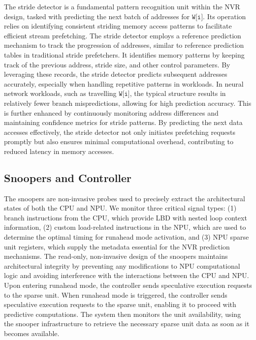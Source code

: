 The stride detector is a fundamental pattern recognition unit within the NVR design, tasked with predicting the next batch of addresses for $\texttt{W[i]}$. Its operation relies on identifying consistent striding memory access patterns to facilitate efficient stream prefetching.
The stride detector employs a reference prediction mechanism to track the progression of addresses, similar to reference prediction tables in traditional stride prefetchers. It identifies memory patterns by keeping track of the previous address, stride size, and other control parameters. By leveraging these records, the stride detector predicts subsequent addresses accurately, especially when handling repetitive patterns in workloads. 
In neural network workloads, such as travelling $\texttt{W[i]}$, the typical structure results in relatively fewer branch mispredictions, allowing for high prediction accuracy. 
This is further enhanced by continuously monitoring address differences and maintaining confidence metrics for stride patterns. By predicting the next data accesses effectively, the stride detector not only initiates prefetching requests promptly but also ensures minimal computational overhead, contributing to reduced latency in memory accesses.




\subsection{Snoopers and Controller}
\vspace{-2pt}
The snoopers are non-invasive probes used to precisely extract the architectural states of both the CPU and NPU. We monitor three critical signal types:
(1) branch instructions from the CPU, which provide LBD with nested loop context information,
(2) custom load-related instructions in the NPU, which are used to determine the optimal timing for runahead mode activation, and
(3) NPU sparse unit registers, which supply the metadata essential for the NVR prediction mechanisms.
The read-only, non-invasive design of the snoopers maintains architectural integrity by preventing any modifications to NPU computational logic and avoiding interference with the interactions between the CPU and NPU.
Upon entering runahead mode, the controller sends speculative execution requests to the sparse unit. 
When runahead mode is triggered, the controller sends speculative execution requests to the sparse unit, enabling it to proceed with predictive computations. The system then monitors the unit availability, using the snooper infrastructure to retrieve the necessary sparse unit data as soon as it becomes available.


